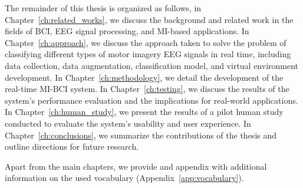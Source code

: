The remainder of this thesis is organized as follows, in Chapter~\ref{ch:related_works}, we discuss the background and related work in the fields of BCI, EEG signal processing, and MI-based applications.
In Chapter~\ref{ch:approach}, we discuss the approach taken to solve the problem of classifying different types of motor imagery EEG signals in real time, including data collection, data augmentation, classification model, and virtual environment development.
In Chapter~\ref{ch:methodology}, we detail the development of the real-time MI-BCI system. %
In Chapter~\ref{ch:testing}, we discuss the results of the system's performance evaluation and the implications for real-world applications.
In Chapter~\ref{ch:human_study}, we present the results of a pilot human study conducted to evaluate the system's usability and user experience.
In Chapter~\ref{ch:conclusions}, we summarize the contributions of the thesis and outline directions for future research.

Apart from the main chapters, we provide and appendix with additional information on the used vocabulary (Appendix~\ref{app:vocabulary}).
